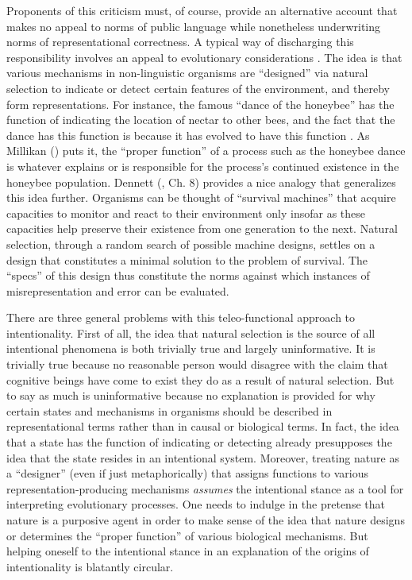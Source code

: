 Proponents of this criticism must, of course, provide an alternative account that makes no appeal to norms of public language while nonetheless underwriting norms of representational correctness. A typical way of discharging this responsibility involves an appeal to evolutionary considerations \citep{Millikan:1989,Millikan:2005,Dennett:1987,Dennett:2010}. The idea is that various mechanisms in non-linguistic organisms are ``designed'' via natural selection to indicate or detect certain features of the environment, and thereby form representations. For instance, the famous ``dance of the honeybee'' has the function of indicating the location of nectar to other bees, and the fact that the dance has this function is because it has evolved to have this function \citep[see][]{Sellars:1953}. As Millikan (\citeyear{Millikan:1989}) puts it, the ``proper function'' of a process such as the honeybee dance is whatever explains or is responsible for the process's continued existence in the honeybee population. Dennett (\citeyear{Dennett:1987}, Ch. 8) provides a nice analogy that generalizes this idea further. Organisms can be thought of ``survival machines'' that acquire capacities to monitor and react to their environment only insofar as these capacities help preserve their existence from one generation to the next. Natural selection, through a random search of possible machine designs, settles on a design that constitutes a minimal solution to the problem of survival. The ``specs'' of this design thus constitute the norms against which instances of misrepresentation and error can be evaluated. 

There are three general problems with this teleo-functional approach to intentionality. First of all, the idea that natural selection is the source of all intentional phenomena is both trivially true and largely uninformative. It is trivially true because no reasonable person would disagree with the claim that cognitive beings have come to exist they do as a result of natural selection. But to say as much is uninformative because no explanation is provided for why certain states and mechanisms in organisms should be described in representational terms rather than in causal or biological terms. In fact, the idea that a state has the function of indicating or detecting already presupposes the idea that the state resides in an intentional system. Moreover, treating nature as a ``designer'' (even if just metaphorically) that assigns functions to various representation-producing mechanisms \textit{assumes} the intentional stance as a tool for interpreting evolutionary processes. One needs to indulge in the pretense that nature is a purposive agent in order to make sense of the idea that nature designs or determines the ``proper function'' of various biological mechanisms. But helping oneself to the intentional stance in an explanation of the origins of intentionality is blatantly circular. 

